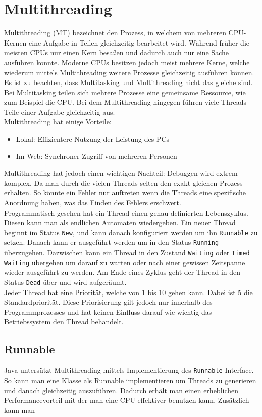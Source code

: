 \documentclass{article}
\begin{document}
	\section{Multithreading}
	Multithreading (MT) bezeichnet den Prozess, in welchem von mehreren CPU-Kernen eine Aufgabe in Teilen gleichzeitig bearbeitet wird. Während früher die meisten CPUs nur einen Kern besaßen und dadurch auch nur eine Sache ausführen konnte. Moderne CPUs besitzen jedoch meist mehrere Kerne, welche wiederum mittels Multithreading weitere Prozesse gleichzeitig ausführen können. \\
	Es ist zu beachten, dass Multitasking und Multithreading nicht das gleiche sind. Bei Multitasking teilen sich mehrere Prozesse eine gemeinsame Ressource, wie zum Beispiel die CPU. Bei dem Multithreading hingegen führen viele Threads Teile einer Aufgabe gleichzeitig aus. \\
	Multithreading hat einige Vorteile:
	\begin{itemize}
		\item{Lokal: Effizientere Nutzung der Leistung des PCs}
		\item{Im Web: Synchroner Zugriff von mehreren Personen}
	\end{itemize}
	Multithreading hat jedoch einen wichtigen Nachteil: Debuggen wird extrem komplex. Da man durch die vielen Threads selten den exakt gleichen Prozess erhalten. So könnte ein Fehler nur auftreten wenn die Threads eine spezifische Anordnung haben, was das Finden des Fehlers erschwert. \\
	Programmatisch gesehen hat ein Thread einen genau definierten Lebenszyklus. Diesen kann man als endlichen Automaten wiedergeben. Ein neuer Thread beginnt im Status \texttt{New}, und kann danach konfiguriert werden um ihn \texttt{Runnable} zu setzen. Danach kann er ausgeführt werden um in den Status \texttt{Running} überzugehen. Dazwischen kann ein Thread in den Zustand \texttt{Waiting} oder \texttt{Timed Waiting} übergehen um darauf zu warten oder nach einer gewissen Zeitspanne wieder ausgeführt zu werden. Am Ende eines Zyklus geht der Thread in den Status \texttt{Dead} über und wird aufgeräumt. \\
	Jeder Thread hat eine Priorität, welche von 1 bis 10 gehen kann. Dabei ist 5 die Standardpriorität. Diese Priorisierung gilt jedoch nur innerhalb des Programmprozesses und hat keinen Einfluss darauf wie wichtig das Betriebssystem den Thread behandelt.
	\subsection{Runnable}
	Java untersützt Multithreading mittels Implementierung des \texttt{Runnable} Interface. So kann man eine Klasse als Runnable implementieren um Threads zu generieren und danach gleichzeitig auszuführen. Dadurch erhält man einen erheblichen Performancevorteil mit der man eine CPU effektiver benutzen kann. Zusätzlich kann man
\end{document}
